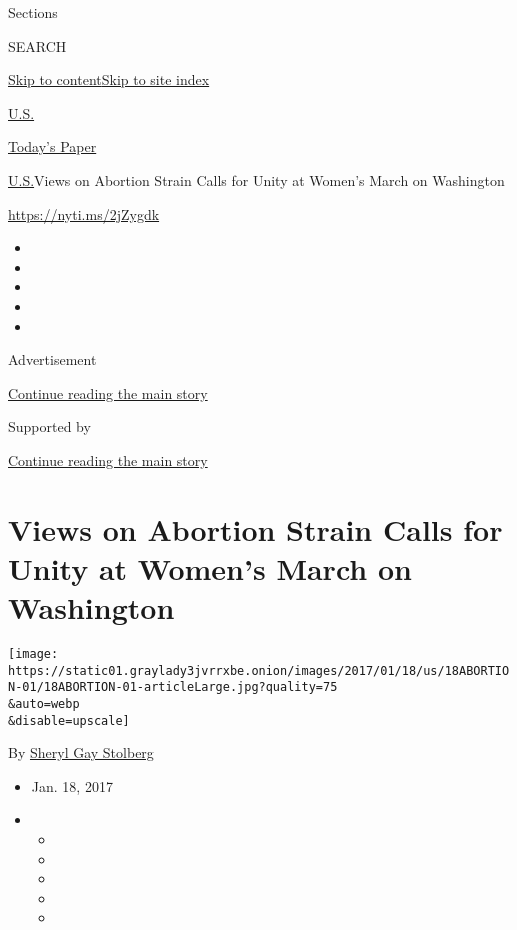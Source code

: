 Sections

SEARCH

\protect\hyperlink{site-content}{Skip to
content}\protect\hyperlink{site-index}{Skip to site index}

\href{https://www.nytimes3xbfgragh.onion/section/us}{U.S.}

\href{https://myaccount.nytimes3xbfgragh.onion/auth/login?response_type=cookie\&client_id=vi}{}

\href{https://www.nytimes3xbfgragh.onion/section/todayspaper}{Today's
Paper}

\href{/section/us}{U.S.}\textbar{}Views on Abortion Strain Calls for
Unity at Women's March on Washington

\url{https://nyti.ms/2jZygdk}

\begin{itemize}
\item
\item
\item
\item
\item
\end{itemize}

Advertisement

\protect\hyperlink{after-top}{Continue reading the main story}

Supported by

\protect\hyperlink{after-sponsor}{Continue reading the main story}

\hypertarget{views-on-abortion-strain-calls-for-unity-at-womens-march-on-washington}{%
\section{Views on Abortion Strain Calls for Unity at Women's March on
Washington}\label{views-on-abortion-strain-calls-for-unity-at-womens-march-on-washington}}

\texttt{[image: https://static01.graylady3jvrrxbe.onion/images/2017/01/18/us/18ABORTION-01/18ABORTION-01-articleLarge.jpg?quality=75\\\&auto=webp\\\&disable=upscale]}

By
\href{http://www.nytimes3xbfgragh.onion/by/sheryl-gay-stolberg}{Sheryl
Gay Stolberg}

\begin{itemize}
\item
  Jan. 18, 2017
\item
  \begin{itemize}
  \item
  \item
  \item
  \item
  \item
  \end{itemize}
\end{itemize}

